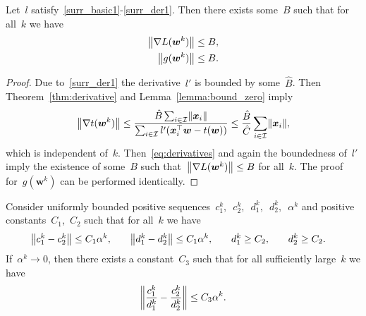\begin{lemma}\label{lemma:bound_g}
  Let~$l$ satisfy~\ref{surr_basic1}-\ref{surr_der1}. Then there exists some~$B$ such that for all~$k$ we have
  \begin{equation*}
    \begin{aligned}
      \norm{\nabla L(\bm{w}^k)} & \le B, \\
      \norm{g(\bm{w}^k)} & \le B.
    \end{aligned}
  \end{equation*}
\end{lemma}
\begin{proof}
  Due to~\ref{surr_der1} the derivative~$l'$ is bounded by some~$\hat{B}$. Then Theorem~\ref{thm:derivative} and Lemma~\ref{lemma:bound_zero} imply
  \begin{equation*}
    \norm{\nabla t(\bm{w}^k)}
      \le \frac{\hat{B} \sum_{i \in \I} \norm{\bm{x}_i}}{\sum_{i \in \I} l'(\bm{x}_i^\top \bm{w} - t(\bm{w}))}
      \le \frac{\hat{B}}{\hat{C}} \sum_{i\in \I} \norm{\bm{x}_i},
  \end{equation*}
  which is independent of~$k$. Then~\eqref{eq:derivatives} and again the boundedness of~$l'$ imply the existence of some~$B$ such that~$\norm{\nabla L(\bm{w}^k)} \le B$ for all~$k$. The proof for~$g(\bm{w}^k)$ can be performed identically.
\end{proof}

\begin{lemma}\label{lemma:ratio}
  Consider uniformly bounded positive sequences~$c_1^k,$~$c_2^k,$~$d_1^k,$~$d_2^k,$~$\alpha^k$ and positive constants~$C_1$,~$C_2$ such that for all~$k$ we have
  \begin{equation*}
    \begin{aligned}
      \norm{c_1^k-c_2^k} & \le C_1\alpha^k, \quad &
      \norm{d_1^k-d_2^k} & \le C_1\alpha^k, \quad &
      d_1^k & \ge C_2, \quad &
      d_2^k & \ge C_2.
    \end{aligned}
  \end{equation*}
  If~$\alpha^k \to 0$, then there exists a constant~$C_3$ such that for all sufficiently large~$k$ we have
  \begin{equation*}
    \norm{\frac{c_1^k}{d_1^k} - \frac{c_2^k}{d_2^k}} \le C_3\alpha^k.
  \end{equation*}
\end{lemma}

